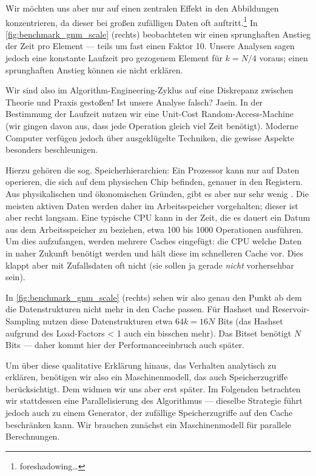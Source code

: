 Wir möchten uns aber nur auf einen zentralen Effekt in den Abbildungen konzentrieren, da dieser bei großen zufälligen Daten oft auftritt.\footnote{foreshadowing\ldots}
In \cref{fig:benchmark_gnm_scale} (rechts) beobachteten wir einen sprunghaften Anstieg der Zeit pro Element --- teils um fast einen Faktor 10.
Unsere Analysen sagen jedoch eine konstante Laufzeit pro gezogenem Element für $k = N/4$ voraus; einen sprunghaften Anstieg können sie nicht erklären.

Wir sind also im Algorithm-Engineering-Zyklus auf eine Diskrepanz zwischen Theorie und Praxis gestoßen!
Ist unsere Analyse falsch? Jaein.
In der Bestimmung der Laufzeit nutzen wir eine Unit-Cost Random-Access-Machine (\dh wir gingen davon aus, dass jede Operation gleich viel Zeit benötigt).
Moderne Computer verfügen jedoch über ausgeklügelte Techniken, die gewisse Aspekte besonders beschleunigen.

Hierzu gehören die sog. Speicherhierarchien: Ein Prozessor kann nur auf Daten operieren, die sich auf dem physischen Chip befinden, genauer in den Registern.
Aus physikalischen und ökonomischen Gründen, gibt es aber nur sehr wenig .
Die meisten aktiven Daten werden daher im Arbeitsspeicher vorgehalten; dieser ist aber recht langsam.
Eine typische CPU kann in der Zeit, die es dauert ein Datum aus dem Arbeitsspeicher zu beziehen, etwa 100 bis 1000 Operationen ausführen.
Um dies aufzufangen, werden mehrere Caches eingefügt: die CPU  welche Daten in naher Zukunft benötigt werden und hält diese im schnelleren Cache vor.
Dies klappt aber mit Zufallsdaten oft nicht (sie sollen ja gerade \emph{nicht} vorhersehbar sein).

In \cref{fig:benchmark_gnm_scale} (rechts) sehen wir also genau den Punkt ab dem die Datenstrukturen nicht mehr in den Cache passen.
Für Hashset und Reservoir-Sampling nutzen diese Datenstrukturen etwa $64 k = 16 N$ Bits (das Hashset aufgrund des Load-Factors < 1 auch ein bisschen mehr).
Das Bitset benötigt $N$ Bits --- daher kommt hier der Performanceeinbruch auch später.

Um über diese qualitative Erklärung hinaus, das Verhalten analytisch zu erklären, benötigen wir also ein Maschinenmodell, das auch Speicherzugriffe berücksichtigt.
Dem widmen wir uns aber erst später.
Im Folgenden betrachten wir stattdessen eine Parallelisierung des Algorithmus --- dieselbe Strategie führt jedoch auch zu einem Generator, der zufällige Speicherzugriffe auf den Cache beschränken kann.
Wir brauchen zunächst ein Maschinenmodell für parallele Berechnungen.

